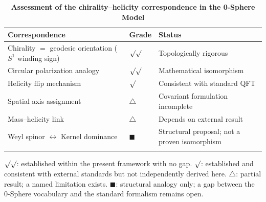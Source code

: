 \documentclass[%
 reprint, amsmath,amssymb, aps, prb, ]{revtex4-2}
\numberwithin{equation}{section}
\begin{document}
\begin{table}[ht]
\caption{\textbf{Assessment of the chirality--helicity correspondence in the 0-Sphere Model}}
\label{tab:assessment}
\centering
\vspace{4pt}
\renewcommand{\arraystretch}{1.5}
\begin{tabular}{p{6.0cm}p{2.4cm}p{7.2cm}}
\toprule
\textbf{Correspondence} & \textbf{Grade} & \textbf{Status} \\
\midrule
Chirality $=$ geodesic orientation ($S^1$ winding sign)
& $\surd\surd$
& Topologically rigorous \\
\addlinespace[0.1cm]
Circular polarization analogy
& $\surd\surd$
& Mathematical isomorphism \\
\addlinespace[0.1cm]
Helicity flip mechanism
& $\surd$
& Consistent with standard QFT \\
\addlinespace[0.1cm]
Spatial axis assignment
& $\triangle$
& Covariant formulation incomplete \\
\addlinespace[0.1cm]
Mass--helicity link
& $\triangle$
& Depends on external result \cite{hanamura10} \\
\addlinespace[0.1cm]
Weyl spinor $\leftrightarrow$ Kernel dominance
& $\blacksquare$
& Structural proposal; not a proven isomorphism \\
\addlinespace[0.1cm]
\bottomrule
\end{tabular}
\vspace{0.2cm}
\begin{minipage}{0.95\textwidth}
\justifying\footnotesize
$\surd\surd$: established within the present framework with no gap. $\surd$: established and consistent with external standards but not independently derived here. $\triangle$: partial result; a named limitation exists. $\blacksquare$: structural analogy only; a gap between the 0-Sphere vocabulary and the standard formalism remains open.


\end{minipage}
\end{table}
\end{document}

